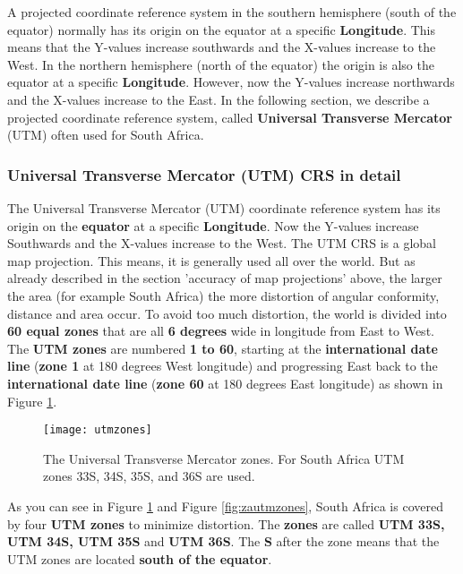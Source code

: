 A projected coordinate reference system in the southern hemisphere (south of
the equator) normally has its origin on the equator at a specific
\textbf{Longitude}.
This means that the Y-values increase southwards and the X-values increase to
the West. In the northern hemisphere (north of the equator) the origin is
also the equator at a specific \textbf{Longitude}. However, now the Y-values
increase
northwards and the X-values increase to the East. In the following section,
we describe a projected coordinate reference system, called \textbf{Universal
Transverse Mercator} (UTM) often used for South Africa. 

\subsubsection{Universal Transverse Mercator (UTM) CRS in detail}

The Universal Transverse Mercator (UTM) coordinate reference system has its
origin on the \textbf{equator} at a specific \textbf{Longitude}. Now the
Y-values increase
Southwards and the X-values increase to the West. The UTM CRS is a global map
projection. This means, it is generally used all over the world. But as
already described in the section 'accuracy of map projections' above, the
larger the area (for example South Africa) the more distortion of angular
conformity, distance and area occur. To avoid too much distortion, the world
is divided into \textbf{60 equal zones} that are all \textbf{6 degrees} wide
in longitude from
East to West. The \textbf{UTM zones} are numbered \textbf{1 to 60}, starting
at the \textbf{international date line} (\textbf{zone 1} at 180 degrees West
longitude) and progressing East back to the \textbf{international date line}
(\textbf{zone 60} at 180 degrees East longitude) as shown in Figure
\ref{fig:utmzones}.

\begin{figure}[ht]
   \begin{center}
   \caption{The Universal Transverse Mercator zones. For South Africa UTM
zones 33S, 34S, 35S, and 36S are used.}
\label{fig:utmzones}\smallskip
   \texttt{[image: utmzones]}
\end{center}
\end{figure}

As you can see in Figure \ref{fig:utmzones} and Figure \ref{fig:zautmzones},
South Africa is covered by four \textbf{UTM zones} to minimize distortion.
The \textbf{zones} are called \textbf{UTM 33S, UTM 34S, UTM 35S} and
\textbf{UTM 36S}. The \textbf{S} after the zone means that
the UTM zones are located \textbf{south of the equator}.

